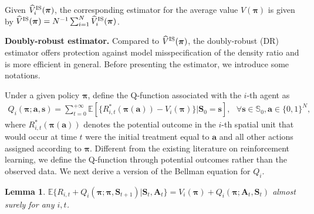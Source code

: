 \documentclass{article}
\newcommand{\Mean}{{\mathbb{E}}}
\newtheorem{lemma}{Lemma}
\begin{document}
Given $\widehat{V}_i^{\scriptsize{\hbox{IS}}}(\bm{\pi})$, the corresponding estimator for the average value $V(\bm{\pi})$ is given by $\widehat{V}^{\scriptsize{\hbox{IS}}}(\bm{\pi})=N^{-1} \sum_{i=1}^N \widehat{V}_i^{\scriptsize{\hbox{IS}}}(\bm{\pi})$. 

\textbf{Doubly-robust estimator.} Compared to $\widehat{V}^{\scriptsize{\hbox{IS}}}(\bm{\pi})$, the doubly-robust (DR) estimator offers protection against model misspecification of the density ratio and is more efficient in general. Before presenting the estimator, we introduce some notations. 

Under a given policy $\bm{\pi}$, define the Q-function associated with the $i$-th agent as\vspace{-0.2cm}
\begin{eqnarray*}
	Q_i(\bm{\pi};\bm{a},\bm{s})=\sum_{t=0}^{+\infty} \Mean[\{R_{i,t}^*(\bm{\pi}(\bm{a}))-V_i(\bm{\pi})\}| \bm{S}_0=\bm{s} ],\,\,\,\,\forall \bm{s}\in \mathbb{S}_0,\bm{a}\in \{0,1\}^N,
\end{eqnarray*}
where $R_{i,t}^*(\bm{\pi}(\bm{a}))$ denotes the potential outcome in the $i$-th spatial unit that would occur at time $t$ were the initial treatment equal to $\bm{a}$ and all other actions assigned according to $\bm{\pi}$. Different from the existing literature on reinforcement learning, we define the Q-function through potential outcomes rather than the observed data. We next derive a version of the Bellman equation for $Q_i$. 

\vspace{-0.2cm}
\begin{lemma}\label{lemma:Q}
	$\Mean \{R_{i,t}+	Q_i(\bm{\pi};\bm{\pi},\bm{S}_{t+1})|\bm{S}_t,\bm{A}_t\}=V_i(\bm{\pi})+Q_i(\bm{\pi};\bm{A}_t,\bm{S}_t)$ almost surely for any $i,t$. 
\end{lemma}
\end{document}
